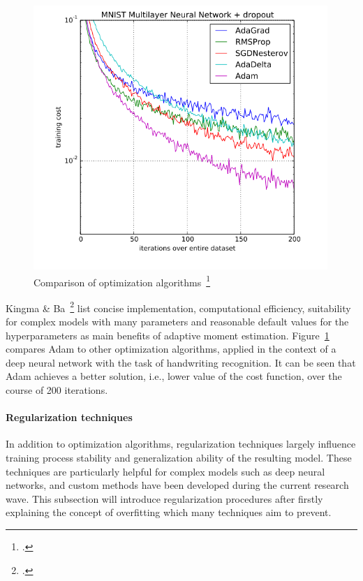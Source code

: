 \begin{figure}[h]
  \includegraphics[height=10cm]{img/adam_comparison}
  \caption[Comparison of optimization algorithms]{Comparison of optimization algorithms~\footcite{Kingma2014a}}
\label{fig:adam_comp}
\end{figure}

Kingma \& Ba~\footcite{Kingma2014a} list concise implementation, computational efficiency,
suitability for complex models with many parameters and reasonable default values
for the hyperparameters as main benefits of adaptive moment estimation.
Figure~\ref{fig:adam_comp} compares Adam to other optimization algorithms,
applied in the context of a deep neural network with the task of handwriting
recognition.
It can be seen that Adam achieves a better solution, i.e., lower value of the
cost function, over the course of 200 iterations.

\paragraph{Regularization techniques}
\label{sub:dl_regularization}

In addition to optimization algorithms, regularization techniques largely
influence training process stability and generalization ability of the
resulting model.
These techniques are particularly helpful for complex models such as deep
neural networks, and custom methods have been developed during the current
research wave.
This subsection will introduce regularization procedures after firstly explaining
the concept of overfitting which many techniques aim to prevent.

